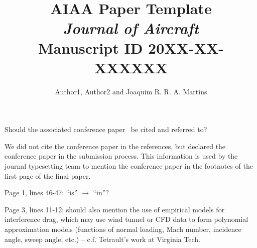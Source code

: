 \documentclass{mdolab-response}
\title{AIAA Paper Template \\
\emph{Journal of Aircraft} \\
Manuscript ID 20XX-XX-XXXXXX}
\author{
Author1,
Author2
and
Joaquim R. R. A. Martins
}
\date{}
\begin{document}
\maketitle



\newreviewer



\begin{revcom}
    Should the associated conference paper~\cite{secco2018sbw} be cited and referred to?
\end{revcom}

\begin{response}
    We did not cite the conference paper in the references, but declared the conference paper in the submission process.
    This information is used by the journal typesetting team to mention the conference paper in the footnotes of the first page of the final paper.
\end{response}


\begin{revcom}
    Page 1, lines 46-47: ``is'' $\rightarrow$ ``in''?
\end{revcom}

\begin{response}
\end{response}


\begin{revcom}
    Page 3, lines 11-12: should also mention the use of empirical models for interference drag, which may use wind tunnel or CFD data to form polynomial approximation models (functions of normal loading, Mach number, incidence angle, sweep angle, etc.) – c.f. Tetrault's work at Virginia Tech.
\end{revcom}

\begin{response}
\end{response}
\end{document}

